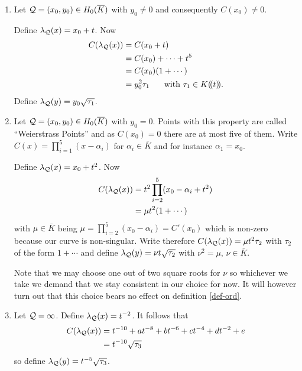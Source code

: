 \documentclass[english,11pt,a4paper]{article}
\begin{document}
\begin{defin}\label{def-lambda}
  \begin{enumerate}[1.]
    \item Let $\mathcal{Q} =(x_0,y_0) \in H_0(\overline K)$ with $y_0 \neq 0$ and consequently $C(x_0)\neq 0$.

    Define $\lambda_{\mathcal{Q}}(x) = x_0 + t$. Now
    \begin{align*}
      C(\lpx) &= C(x_0+t)\\
              &= C(x_0)+ \cdots + t^5\\
              &= C(x_0)(1 + \cdots)\\ %
              &= y_0^2 \tau_1 \text{\hspace{5mm} with } \tau_1 \in K (\! (t)\! ).
    \end{align*}
    Define $\lambda_{\mathcal{Q}}(y) = y_0 \sqrt{\tau_1}$.

    \item Let $\mathcal{Q} =(x_0,y_0) \in H_0(\overline K)$ with $y_0 = 0$. Points with this property are called ``Weierstrass Points'' and as $C(x_0)=0$ there are at most five of them. Write $C(x)=\prod_{i=1}^5 (x-\alpha_i)$ for $\alpha_i \in \bar K$ and for instance $\alpha_1 = x_0$.

    Define $\lambda_{\mathcal{Q}}(x) = x_0 + t^2$. Now
    \begin{align*}
      C(\lambda_{\mathcal{Q}}(x)) &= t^2 \prod_{i=2}^5 (x_0 -\alpha_i + t^2) \\
              &= \mu t^2 (1 + \cdots)
    \end{align*}
    with $\mu \in \bar K$ being $\mu = \prod_{i=2}^5 (x_0 - \alpha_i) = C'(x_0)$ which is non-zero because our curve is non-singular. Write therefore $C(\lambda_{\mathcal{Q}}(x)) = \mu t^2 \tau_2$ with $\tau_2$ of the form $1 + \cdots$ and define $\lambda_{\mathcal{Q}}(y) = \nu t \sqrt{\tau_2}$ with $\nu^2 = \mu$, $\nu \in  \bar K$.

    Note that we may choose one out of two square roots for $\nu$ so whichever we take we demand that we stay consistent in our choice for now. It will however turn out that this choice bears no effect on definition \ref{def-ord}.

    \item Let $\mathcal{Q} = \infty$. Define $\lambda_{\mathcal{Q}}(x) = t^{-2}$. It follows that
    \begin{align*}
      C(\lambda_{\mathcal{Q}}(x)) &= t^{-10} + at^{-8} + bt^{-6}
                        + ct^{-4}    + dt^{-2} + e\\
                       &= t^{-10} \sqrt{\tau_3}
    \end{align*}
    so define $\lambda_{\mathcal{Q}}(y) = t^{-5} \sqrt{\tau_3}$.
  \end{enumerate}
\end{defin}
\end{document}
